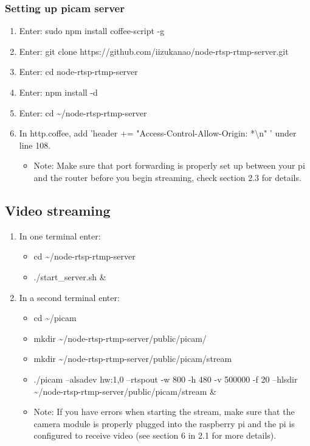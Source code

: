 \documentclass[onecolumn, draftclsnofoot,10pt, compsoc]{IEEEtran}
\begin{document}
\subsubsection{Setting up picam server}
\begin{enumerate}
\item  Enter: sudo npm install coffee-script -g 
\item  Enter: git clone https://github.com/iizukanao/node-rtsp-rtmp-server.git 
\item  Enter: cd node-rtsp-rtmp-server 
\item  Enter: npm install -d 
\item  Enter: cd \~{}/node-rtsp-rtmp-server
\item  In http.coffee, add 'header += "Access-Control-Allow-Origin: *\textbackslash n" ' under line 108. 
\begin{itemize}
    \item Note: Make sure that port forwarding is properly set up between your pi and the router before you begin streaming, check section 2.3 for details.
\end{itemize}

\end{enumerate}
\subsection{Video streaming}
\begin{enumerate}
    \item In one terminal enter:
    \begin{itemize}
        \item cd \~{}/node-rtsp-rtmp-server 
        \item ./start\_server.sh & 
    \end{itemize}
\item In a second terminal enter: 
\begin{itemize}
    \item  cd \~{}/picam 
    \item mkdir \~{}/node-rtsp-rtmp-server/public/picam/
    \item mkdir \~{}/node-rtsp-rtmp-server/public/picam/stream
    \item ./picam --alsadev hw:1,0 --rtspout -w 800 -h 480 -v 500000 -f 20 --hlsdir \~{}/node-rtsp-rtmp-server/public/picam/stream & 
    \item Note: If you have errors when starting the stream, make sure that the camera module is properly plugged into the raspberry pi and the pi is configured to receive video (see section 6 in 2.1 for more details).
\end{itemize}
\end{enumerate}
\end{document}
